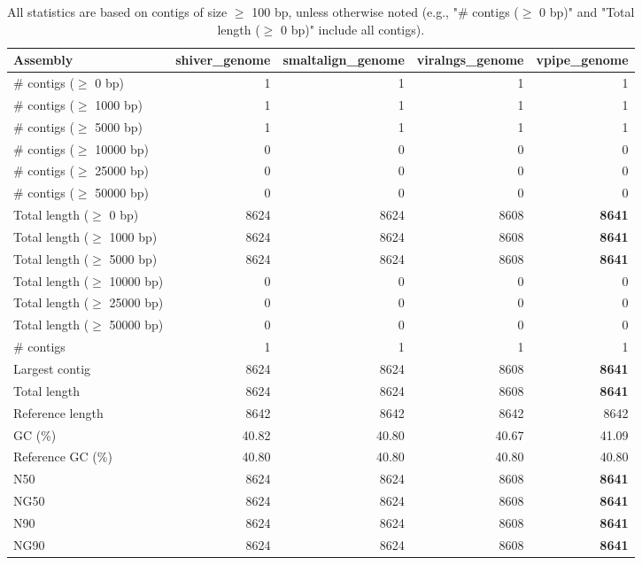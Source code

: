 \documentclass[12pt,a4paper]{article}
\begin{document}
\begin{table}[ht]
\begin{center}
\caption{All statistics are based on contigs of size $\geq$ 100 bp, unless otherwise noted (e.g., "\# contigs ($\geq$ 0 bp)" and "Total length ($\geq$ 0 bp)" include all contigs).}
\begin{tabular}{|l*{4}{|r}|}
\hline
Assembly & shiver\_genome & smaltalign\_genome & viralngs\_genome & vpipe\_genome \\ \hline
\# contigs ($\geq$ 0 bp) & 1 & 1 & 1 & 1 \\ \hline
\# contigs ($\geq$ 1000 bp) & 1 & 1 & 1 & 1 \\ \hline
\# contigs ($\geq$ 5000 bp) & 1 & 1 & 1 & 1 \\ \hline
\# contigs ($\geq$ 10000 bp) & 0 & 0 & 0 & 0 \\ \hline
\# contigs ($\geq$ 25000 bp) & 0 & 0 & 0 & 0 \\ \hline
\# contigs ($\geq$ 50000 bp) & 0 & 0 & 0 & 0 \\ \hline
Total length ($\geq$ 0 bp) & 8624 & 8624 & 8608 & {\bf 8641} \\ \hline
Total length ($\geq$ 1000 bp) & 8624 & 8624 & 8608 & {\bf 8641} \\ \hline
Total length ($\geq$ 5000 bp) & 8624 & 8624 & 8608 & {\bf 8641} \\ \hline
Total length ($\geq$ 10000 bp) & 0 & 0 & 0 & 0 \\ \hline
Total length ($\geq$ 25000 bp) & 0 & 0 & 0 & 0 \\ \hline
Total length ($\geq$ 50000 bp) & 0 & 0 & 0 & 0 \\ \hline
\# contigs & 1 & 1 & 1 & 1 \\ \hline
Largest contig & 8624 & 8624 & 8608 & {\bf 8641} \\ \hline
Total length & 8624 & 8624 & 8608 & {\bf 8641} \\ \hline
Reference length & 8642 & 8642 & 8642 & 8642 \\ \hline
GC (\%) & 40.82 & 40.80 & 40.67 & 41.09 \\ \hline
Reference GC (\%) & 40.80 & 40.80 & 40.80 & 40.80 \\ \hline
N50 & 8624 & 8624 & 8608 & {\bf 8641} \\ \hline
NG50 & 8624 & 8624 & 8608 & {\bf 8641} \\ \hline
N90 & 8624 & 8624 & 8608 & {\bf 8641} \\ \hline
NG90 & 8624 & 8624 & 8608 & {\bf 8641} \\ \hline

\end{tabular}
\end{center}
\end{table}
\end{document}
